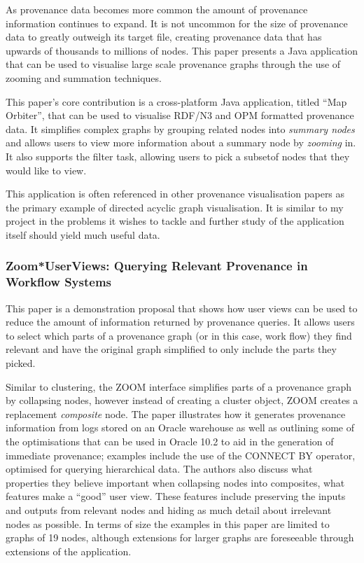 As provenance data becomes more common the amount of provenance information continues to expand. It is not uncommon for the size of provenance data to greatly outweigh its target file, creating provenance data that has upwards of thousands to millions of nodes. This paper presents a Java application that can be used to visualise large scale provenance graphs through the use of zooming and summation techniques.

This paper's core contribution is a cross-platform Java application, titled ``Map Orbiter'', that can be used to visualise RDF/N3 and OPM formatted provenance data. It simplifies complex graphs by grouping related nodes into \textit{summary nodes} and allows users to view more information about a summary node by \textit{zooming} in. It also supports the filter task, allowing users to pick a subsetof nodes that they would like to view. 

This application is often referenced in other provenance visualisation papers as the primary example of directed acyclic graph visualisation. It is similar to my project in the problems it wishes to tackle and further study of the application itself should yield much useful data.

\subsubsection{Zoom*UserViews: Querying Relevant Provenance in Workflow Systems\cite{Biton2007}}
\label{sub:zoom_userviews_querying_relevant_provenance_in_wokflow_systems}

This paper is a demonstration proposal that shows how user views can be used to reduce the amount of information returned by provenance queries. It allows users to select which parts of a provenance graph (or in this case, work flow) they find relevant and have the original graph simplified to only include the parts they picked.

Similar to clustering, the ZOOM interface simplifies parts of a provenance graph by collapsing nodes, however instead of creating a cluster object, ZOOM creates a replacement \textit{composite} node. The paper illustrates how it generates provenance information from logs stored on an Oracle warehouse as well as outlining some of the optimisations that can be used in Oracle 10.2 to aid in the generation of immediate provenance; examples include the use of the CONNECT BY operator, optimised for querying hierarchical data. The authors also discuss what properties they believe important when collapsing nodes into composites, what features make a ``good'' user view. These features include preserving the inputs and outputs from relevant nodes and hiding as much detail about irrelevant nodes as possible. In terms of size the examples in this paper are limited to graphs of 19 nodes, although extensions for larger graphs are foreseeable through extensions of the application.

